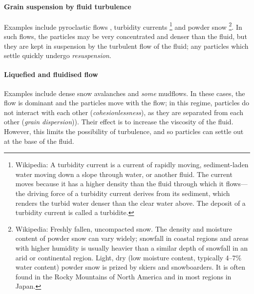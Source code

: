 \paragraph{Grain suspension by fluid turbulence} Examples include pyroclastic
flows
, turbidity currents
\footnote{Wikipedia: A turbidity current is a current of rapidly moving,
sediment-laden water moving down a slope through water, or another fluid. The
current moves because it has a higher density than the fluid through which it
flows—the driving force of a turbidity current derives from its sediment, which
renders the turbid water denser than the clear water above. The deposit of a
turbidity current is called a turbidite.}
and powder snow
\footnote{Wikipedia: Freshly fallen, uncompacted snow. The density and moisture
content of powder snow can vary widely; snowfall in coastal regions and areas
with higher humidity is usually heavier than a similar depth of snowfall in an
arid or continental region. Light, dry (low moisture content, typically 4–7\%
water content) powder snow is prized by skiers and snowboarders. It is often
found in the Rocky Mountains of North America and in most regions in Japan.}. 
In such flows, the particles may be very concentrated and denser than the fluid, but
they are kept in suspension by the turbulent flow of the fluid; any particles
which settle quickly undergo \textit{resuspension}.

\paragraph{Liquefied and fluidised flow} Examples include dense snow avalanches
and \textit{some} mudflows. In these cases, the flow is dominant and the
particles move with the flow; in this regime, particles do not interact with
each other (\textit{cohesionlessness}), as they are separated from each other
(\textit{grain dispersion})). Their effect is to increase the viscosity of the
fluid. However, this limits the possibility of turbulence, and so particles can 
settle out at the base of the fluid.

